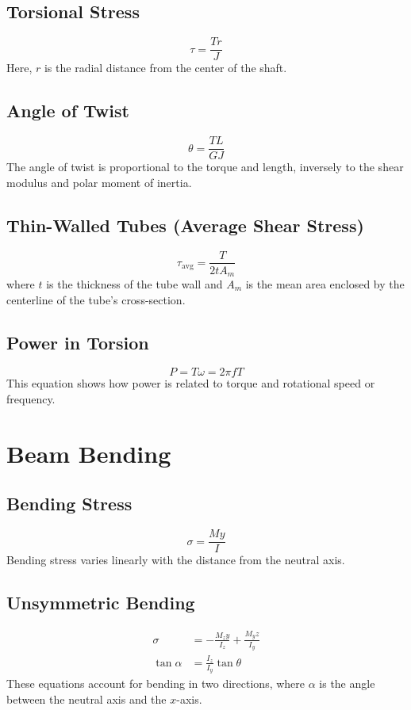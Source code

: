 \documentclass[12pt]{article}
\begin{document}
\subsection{Torsional Stress}
\begin{equation}
\tau = \frac{T r}{J}
\end{equation}
Here, $r$ is the radial distance from the center of the shaft.

\subsection{Angle of Twist}
\begin{equation}
\theta = \frac{T L}{G J}
\end{equation}
The angle of twist is proportional to the torque and length, inversely to the shear modulus and polar moment of inertia.

\subsection{Thin-Walled Tubes (Average Shear Stress)}
\begin{equation}
\tau_{\text{avg}} = \frac{T}{2t A_m}
\end{equation}
where $t$ is the thickness of the tube wall and $A_m$ is the mean area enclosed by the centerline of the tube's cross-section.

\subsection{Power in Torsion}
\begin{equation}
P = T \omega = 2\pi f T
\end{equation}
This equation shows how power is related to torque and rotational speed or frequency.

\section{Beam Bending}
\subsection{Bending Stress}
\begin{equation}
\sigma = \frac{M y}{I}
\end{equation}
Bending stress varies linearly with the distance from the neutral axis.

\subsection{Unsymmetric Bending}
\begin{align}
\sigma &= -\frac{M_z y}{I_z} + \frac{M_y z}{I_y} \\
\tan \alpha &= \frac{I_z}{I_y} \tan \theta
\end{align}
These equations account for bending in two directions, where $\alpha$ is the angle between the neutral axis and the $x$-axis.
\end{document}
